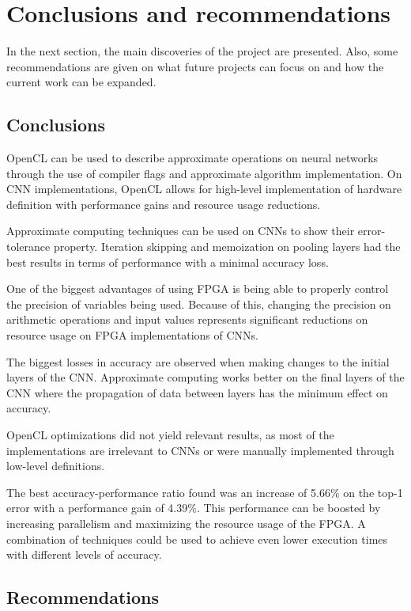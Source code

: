 \chapter{Conclusions and recommendations}

In the next section, the main discoveries of the project are
presented. Also, some recommendations are given on what
future projects can focus on and how the current work
can be expanded.

\section{Conclusions}

OpenCL can be used to describe approximate operations on neural networks through
the use of compiler flags and approximate algorithm
implementation. On CNN implementations, OpenCL allows
for high-level implementation of hardware definition with
performance gains and resource usage reductions.

Approximate computing techniques can be used
on CNNs to show their error-tolerance property. 
Iteration skipping and memoization 
on pooling layers had
the best results in terms of performance with a minimal accuracy loss.

One of the biggest advantages of using FPGA is being able to properly control
the precision of variables being used. Because of this, changing the precision
on arithmetic operations and input values represents significant reductions on resource
usage on FPGA implementations of CNNs.

The biggest losses in accuracy are observed when making changes to
the initial layers of the CNN. Approximate computing works better
on the final layers of the CNN where the propagation of data
between layers has the minimum effect on accuracy.

OpenCL optimizations did not yield relevant results, as most of the
implementations are irrelevant to CNNs or were manually implemented
through low-level definitions.

The best accuracy-performance ratio found was an increase of 5.66\% on the top-1 error
with a performance gain of 4.39\%. This performance can be boosted
by increasing parallelism and maximizing the resource usage
of the FPGA. A combination of techniques could be used to achieve even 
lower execution times with different levels of accuracy.

\section{Recommendations}

